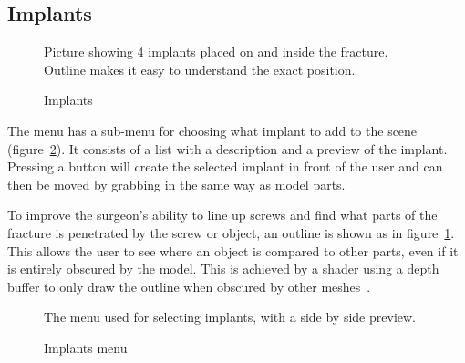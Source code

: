 \documentclass[a4paper]{report}
\begin{document}
\subsection{Implants}

\begin{figure}[h!]
    \centering
	\hfill
	\caption{Implants}\label{implants}
  \small
  Picture showing 4 implants placed on and inside the fracture. Outline makes it easy to understand the exact position.
\end{figure}

The menu has a sub-menu for choosing what implant to add to the scene (figure~\ref{implantsmenu}). It consists of a list with a description and a preview of the implant. Pressing a button will create the selected implant in front of the user and can then be moved by grabbing in the same way as model parts.

To improve the surgeon's ability to line up screws and find what parts of the fracture is penetrated by the screw or object, an outline is shown as in figure~\ref{implants}. This allows the user to see where an object is compared to other parts, even if it is entirely obscured by the model. This is achieved by a shader using a depth buffer to only draw the outline when obscured by other meshes~\cite{technologies_unity_nodate-1}.

\begin{figure}[h!]
    \centering
	\hfill
	\caption{Implants menu}\label{implantsmenu}
  \small
  The menu used for selecting implants, with a side by side preview.
\end{figure}
\end{document}
